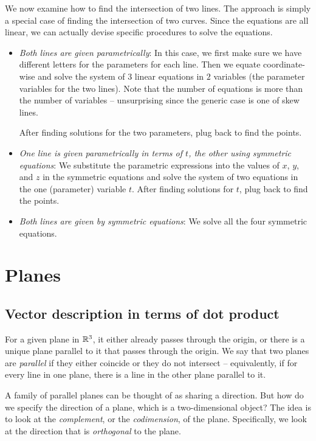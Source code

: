 \documentclass[10pt]{amsart}
\begin{document}
We now examine how to find the intersection of two lines. The approach
is simply a special case of finding the intersection of two
curves. Since the equations are all linear, we can actually devise
specific procedures to solve the equations.

\begin{itemize}
\item {\em Both lines are given parametrically}: In this case, we
  first make sure we have different letters for the parameters for
  each line. Then we equate coordinate-wise and solve the system of
  $3$ linear equations in $2$ variables (the parameter variables for
  the two lines). Note that the number of equations is more than the
  number of variables -- unsurprising since the generic case is one of
  skew lines.

  After finding solutions for the two parameters, plug back to find
  the points.
\item {\em One line is given parametrically in terms of $t$, the other
  using symmetric equations}: We substitute the parametric expressions
  into the values of $x$, $y$, and $z$ in the symmetric equations and
  solve the system of two equations in the one (parameter) variable
  $t$. After finding solutions for $t$, plug back to find the points.
\item {\em Both lines are given by symmetric equations}: We solve all
  the four symmetric equations.
\end{itemize}

\section{Planes}

\subsection{Vector description in terms of dot product}

For a given plane in $\mathbb{R}^3$, it either already passes through the
origin, or there is a unique plane parallel to it that passes through
the origin. We say that two planes are {\em parallel} if they either
coincide or they do not intersect -- equivalently, if for every line
in one plane, there is a line in the other plane parallel to it.

A family of parallel planes can be thought of as sharing a
direction. But how do we specify the direction of a plane, which is a
two-dimensional object? The idea is to look at the {\em complement},
or the {\em codimension}, of the plane. Specifically, we look at the
direction that is {\em orthogonal} to the plane.
\end{document}
